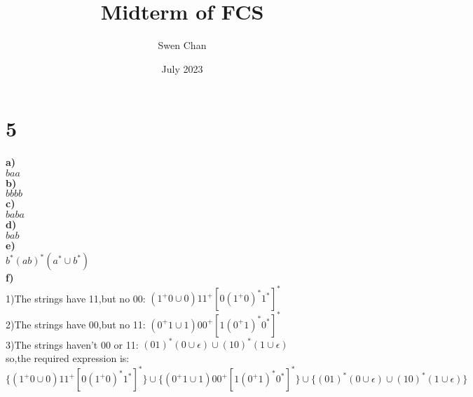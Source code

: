 \documentclass{article}
\title{Midterm of FCS}
\author{Swen Chan}
\date{July 2023}
\begin{document}
\maketitle

\section*{5}
\textbf{a)}\\
\(baa\)\\
\textbf{b)}\\
\(bbbb\)\\
\textbf{c)}\\
\(baba\)\\
\textbf{d)}\\
\(bab\)\\
\textbf{e)}\\
\(b^*(ab)^*(a^*\cup b^*) \)\\
\textbf{f)}\\
1)The strings have 11,but no 00:  \((1^+0\cup 0)11^+[0(1^+0)^*1^*]^*\)\\
2)The strings have 00,but no 11:  \((0^+1\cup 1)00^+[1(0^+1)^*0^*]^*\)\\
3)The strings haven't 00 or 11:   \((01)^*(0\cup \epsilon)\cup (10)^*(1\cup \epsilon)\)\\
so,the required expression is:\\\(\{(1^+0\cup 0)11^+[0(1^+0)^*1^*]^*\}\cup \{(0^+1\cup 1)00^+[1(0^+1)^*0^*]^*\}\cup \{(01)^*(0\cup \epsilon)\cup (10)^*(1\cup \epsilon)\}\)
\end{document}
